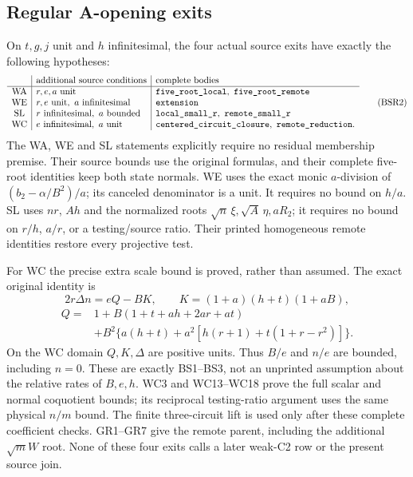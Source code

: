 \subsection{Regular A-opening exits}

On \(t,g,j\) unit and \(h\) infinitesimal, the four actual
source exits have exactly the following hypotheses:
\[
\begin{array}{c|l|l}
 &\text{additional source conditions}&\text{complete bodies}\\ \hline
 {\rm WA}&r,e,a\text{ unit}&
       \texttt{five\_root\_local},\ \texttt{five\_root\_remote}\\
 {\rm WE}&r,e\text{ unit},\ a\text{ infinitesimal}&
       \texttt{extension}\\
 {\rm SL}&r\text{ infinitesimal},\ a\text{ bounded}&
       \texttt{local\_small\_r},\ \texttt{remote\_small\_r}\\
 {\rm WC}&e\text{ infinitesimal},\ a\text{ unit}&
       \texttt{centered\_circuit\_closure},\
       \texttt{remote\_reduction}.
\end{array}
\tag{BSR2}
\]
The WA, WE and SL statements explicitly require no residual
membership premise.  Their source bounds use the original formulas,
and their complete five-root identities keep both state normals.
WE uses the exact monic \(a\)-division of
\((b_2-\alpha/B^2)/a\); its canceled denominator is a unit.
It requires no bound on \(h/a\).
SL uses \(nr\), \(Ah\) and the normalized roots
\(\sqrt n\,\xi,\sqrt A\,\eta,aR_2\); it requires no bound on
\(r/h\), \(a/r\), or a testing/source ratio.
Their printed homogeneous remote identities restore every
projective test.

For WC the precise extra scale bound is proved, rather than
assumed.  The exact original identity is
\[
 2r\Delta n=eQ-BK,\qquad
 K=(1+a)(h+t)(1+aB),
 \tag{BSR3}
\]
\[
 \begin{split}
 Q={}&1+B(1+t+ah+2ar+at)\\
    &+B^2\{a(h+t)+a^2[h(r+1)+t(1+r-r^2)]\}.
 \end{split}
\]
On the WC domain \(Q,K,\Delta\) are positive units.  Thus
\(B/e\) and \(n/e\) are bounded, including \(n=0\).
These are exactly BS1--BS3, not an unprinted assumption
about the relative rates of \(B,e,h\).
WC3 and WC13--WC18 prove the full scalar and normal coquotient
bounds; its reciprocal testing-ratio argument uses the same
physical \(n/m\) bound.  The finite three-circuit lift is used
only after these complete coefficient checks.  GR1--GR7 give
the remote parent, including the additional \(\sqrt m W\)
root.  None of these four exits calls a later weak-C2 row
or the present source join.


